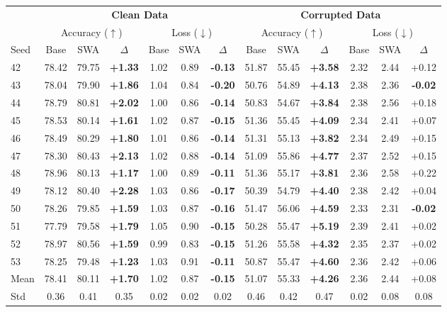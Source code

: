 \begin{table}[H]
\centering
\setlength{\tabcolsep}{3.5pt}

\begin{tabular}{lcccccc|cccccc}
\toprule
& \multicolumn{6}{c}{\textbf{Clean Data}} & \multicolumn{6}{c}{\textbf{Corrupted Data}} \\
\cmidrule(lr){2-7} \cmidrule(lr){8-13}
& \multicolumn{3}{c}{Accuracy ($\uparrow$)} & \multicolumn{3}{c}{Loss ($\downarrow$)} & \multicolumn{3}{c}{Accuracy ($\uparrow$)} & \multicolumn{3}{c}{Loss ($\downarrow$)} \\
\cmidrule(lr){2-4} \cmidrule(lr){5-7} \cmidrule(lr){8-10} \cmidrule(lr){11-13}
Seed & Base & SWA & $\Delta$ & Base & SWA & $\Delta$ & Base & SWA & $\Delta$ & Base & SWA & $\Delta$ \\
\midrule
42 & 78.42 & 79.75 & \textbf{+1.33} & 1.02 & 0.89 & \textbf{-0.13} & 51.87 & 55.45 & \textbf{+3.58} & 2.32 & 2.44 & +0.12 \\
43 & 78.04 & 79.90 & \textbf{+1.86} & 1.04 & 0.84 & \textbf{-0.20} & 50.76 & 54.89 & \textbf{+4.13} & 2.38 & 2.36 & \textbf{-0.02} \\
44 & 78.79 & 80.81 & \textbf{+2.02} & 1.00 & 0.86 & \textbf{-0.14} & 50.83 & 54.67 & \textbf{+3.84} & 2.38 & 2.56 & +0.18 \\
45 & 78.53 & 80.14 & \textbf{+1.61} & 1.02 & 0.87 & \textbf{-0.15} & 51.36 & 55.45 & \textbf{+4.09} & 2.34 & 2.41 & +0.07 \\
46 & 78.49 & 80.29 & \textbf{+1.80} & 1.01 & 0.86 & \textbf{-0.14} & 51.31 & 55.13 & \textbf{+3.82} & 2.34 & 2.49 & +0.15 \\
47 & 78.30 & 80.43 & \textbf{+2.13} & 1.02 & 0.88 & \textbf{-0.14} & 51.09 & 55.86 & \textbf{+4.77} & 2.37 & 2.52 & +0.15 \\
48 & 78.96 & 80.13 & \textbf{+1.17} & 1.00 & 0.89 & \textbf{-0.11} & 51.36 & 55.17 & \textbf{+3.81} & 2.36 & 2.58 & +0.22 \\
49 & 78.12 & 80.40 & \textbf{+2.28} & 1.03 & 0.86 & \textbf{-0.17} & 50.39 & 54.79 & \textbf{+4.40} & 2.38 & 2.42 & +0.04 \\
50 & 78.26 & 79.85 & \textbf{+1.59} & 1.03 & 0.87 & \textbf{-0.16} & 51.47 & 56.06 & \textbf{+4.59} & 2.33 & 2.31 & \textbf{-0.02} \\
51 & 77.79 & 79.58 & \textbf{+1.79} & 1.05 & 0.90 & \textbf{-0.15} & 50.28 & 55.47 & \textbf{+5.19} & 2.39 & 2.41 & +0.02 \\
52 & 78.97 & 80.56 & \textbf{+1.59} & 0.99 & 0.83 & \textbf{-0.15} & 51.26 & 55.58 & \textbf{+4.32} & 2.35 & 2.37 & +0.02 \\
53 & 78.25 & 79.48 & \textbf{+1.23} & 1.03 & 0.91 & \textbf{-0.11} & 50.87 & 55.47 & \textbf{+4.60} & 2.36 & 2.42 & +0.06 \\
\midrule
Mean & 78.41 & 80.11 & \textbf{+1.70} & 1.02 & 0.87 & \textbf{-0.15} & 51.07 & 55.33 & \textbf{+4.26} & 2.36 & 2.44 & +0.08 \\
Std & 0.36 & 0.41 & 0.35 & 0.02 & 0.02 & 0.02 & 0.46 & 0.42 & 0.47 & 0.02 & 0.08 & 0.08 \\
\bottomrule
\end{tabular}



\end{table}
